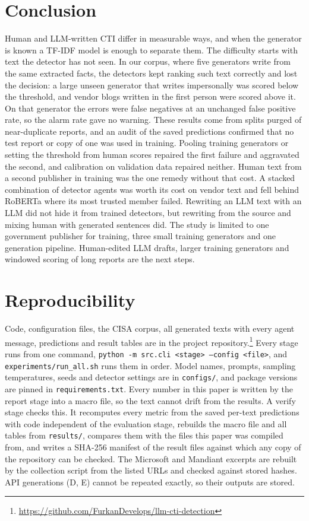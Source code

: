 \documentclass[journal]{IEEEtran}
\begin{document}
\section{Conclusion}
Human and LLM-written CTI differ in measurable ways, and when the generator is known a TF-IDF model is enough to
separate them. The difficulty starts with text the detector has not seen. In our corpus, where five generators
write from the same extracted facts, the detectors kept ranking such text correctly and lost the decision: a large
unseen generator that writes impersonally was scored below the threshold, and vendor blogs written in the first
person were scored above it. On that generator the errors were false negatives at an unchanged false positive rate,
so the alarm rate gave no warning. These results come from splits purged of near-duplicate reports, and an audit of
the saved predictions confirmed that no test report or copy of one was used in training. Pooling training generators or setting the threshold from human scores repaired the
first failure and aggravated the second, and calibration on validation data repaired neither. Human text from a
second publisher in training was the one remedy without that cost. A stacked combination of detector agents was
worth its cost on vendor text and fell behind RoBERTa where its most trusted member failed. Rewriting an LLM text
with an LLM did not hide it from trained detectors, but rewriting from the source and mixing human with generated
sentences did. The study is limited to one government publisher for training, three small training generators and
one generation pipeline. Human-edited LLM drafts, larger training generators and windowed scoring of long reports
are the next steps.

\section*{Reproducibility}
Code, configuration files, the CISA corpus, all generated texts with every agent message, predictions and result
tables are in the project repository.\footnote{\url{https://github.com/FurkanDevelops/llm-cti-detection}} Every
stage runs from one command, \texttt{python -m src.cli <stage> --config <file>}, and
\texttt{experiments/run\_all.sh} runs them in order. Model names, prompts, sampling temperatures, seeds and
detector settings are in \texttt{configs/}, and package versions are pinned in \texttt{requirements.txt}. Every
number in this paper is written by the report stage into a macro file, so the text cannot drift from the results.
A verify stage checks this. It recomputes every metric from the saved per-text predictions with code independent
of the evaluation stage, rebuilds the macro file and all tables from \texttt{results/}, compares them with the
files this paper was compiled from, and writes a SHA-256 manifest of the result files against which any copy of the
repository can be checked.
The Microsoft and Mandiant excerpts are rebuilt by the collection script from the listed URLs and checked against
stored hashes. API generations (D, E) cannot be repeated exactly, so their outputs are stored.



\end{document}
